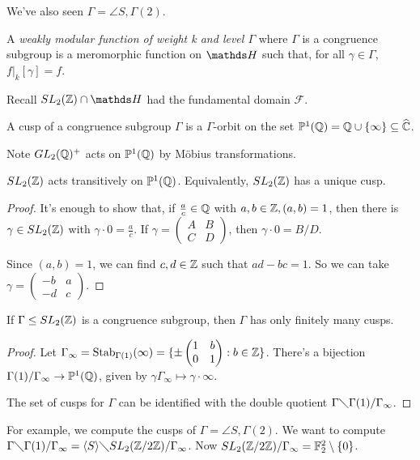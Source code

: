 \documentclass[10pt,a4paper]{article}
\begin{document}
We've also seen $\Gamma = \angle{S, \Gamma(2)}$.
\begin{definition}
  A \emph{weakly modular function of weight k and level $\Gamma$} where $\Gamma$ is a congruence subgroup is a meromorphic function on $\H$ such that, for all $\gamma \in \Gamma$, $f|_k[\gamma] = f$.
\end{definition}
Recall $SL_2(\Z) \cap \H$ had the fundamental domain $\mathscr{F}$.
\begin{definition}
  A cusp of a congruence subgroup $\Gamma$ is a $\Gamma$-orbit on the set $\mathbb{P}^1(\mathbb{Q}) = \mathbb{Q} \cup \{\infty\} \subseteq \widehat{\mathbb{C}}$.
\end{definition}
Note $GL_2(\mathbb{Q})^+$ acts on $\mathbb{P}^1(\mathbb{Q})$ by M\"obius transformations.
\begin{lemma}
  $SL_2(\mathbb{Z})$ acts transitively on $\mathbb{P}^1(\mathbb{Q})$. Equivalently, $SL_2(\mathbb{Z})$ has a unique cusp.
\end{lemma}
\begin{proof}
  It's enough to show that, if $\frac{a}{c} \in \mathbb{Q}$ with $a,b \in \mathbb{Z}, (a,b)=1$, then there is $\gamma \in SL_2(\mathbb{Z})$ with $\gamma \cdot 0 = \frac{a}{c}$. If $\gamma = \begin{pmatrix}A&B\\C& D \end{pmatrix}$, then $\gamma \cdot 0 = B/D$.

  Since $(a,b) = 1$, we can find $c,d \in \mathbb{Z}$ such that $ad-bc = 1$. So we can take $\gamma = \begin{pmatrix}-b & a\\-d&c\end{pmatrix}$.
\end{proof}
\begin{corollary}
  If $\Gamma \leq SL_2(\mathbb{Z})$ is a congruence subgroup, then $\Gamma$ has only finitely many cusps.
\end{corollary}
\begin{proof}
  Let $\Gamma_\infty = \operatorname{Stab}_{\Gamma(1)}(\infty) = \{\pm\begin{pmatrix}1 & b\\ 0 & 1\end{pmatrix} : b \in \mathbb{Z}\}$. There's a bijection $\Gamma(1)/\Gamma_\infty \to \mathbb{P}^1(\mathbb{Q})$, given by $\gamma \Gamma_\infty \mapsto \gamma\cdot\infty$.

  The set of cusps for $\Gamma$ can be identified with the double quotient $\Gamma \diagdown \Gamma(1) / \Gamma_\infty$.
\end{proof}
For example, we compute the cusps of $\Gamma = \angle{S, \Gamma(2)}$. We want to compute $\Gamma \diagdown \Gamma(1)/\Gamma_\infty = \langle S \rangle\diagdown SL_2(\mathbb{Z}/2\mathbb{Z})/\Gamma_\infty$. Now $SL_2(\mathbb{Z}/2\mathbb{Z})/\Gamma_\infty = \mathbb{F}_2^2 \setminus\{0\}$.
\end{document}

